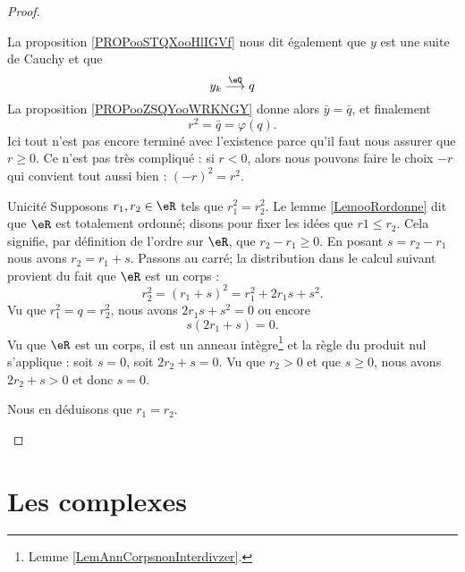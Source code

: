 \begin{proof}
\begin{subproof}
            La proposition \ref{PROPooSTQXooHlIGVf} nous dit également que \( y\) est une suite de Cauchy et que
            \begin{equation}
                y_k\stackrel{\eQ}{\longrightarrow}q
            \end{equation}
            La proposition \ref{PROPooZSQYooWRKNGY} donne alors \( \bar y=\bar q\), et finalement
            \begin{equation}
                r^2=\bar q=\varphi(q).
            \end{equation}
            Ici tout n'est pas encore terminé avec l'existence parce qu'il faut nous assurer que \( r\geq 0\). Ce n'est pas très compliqué : si \( r<0\), alors nous pouvons faire le choix \( -r\) qui convient tout aussi bien : \( (-r)^2=r^2\).
        \item[Unicité]
            Supposons \( r_1,r_2\in \eR\) tels que \( r_1^2=r_2^2\). Le lemme \ref{LemooRordonne} dit que \( \eR\) est totalement ordonné; disons pour fixer les idées que \( r1\leq r_2\). Cela signifie, par définition de l'ordre sur \( \eR\), que \( r_2-r_1\geq 0\). En posant \( s=r_2-r_1\) nous avons \( r_2=r_1+s\). Passons au carré; la distribution dans le calcul suivant provient du fait que \( \eR\) est un corps :
            \begin{equation}
                r_2^2=(r_1+s)^2=r_1^2+2r_1s+s^2.
            \end{equation}
            Vu que \( r_1^2=q=r_2^2\), nous avons \( 2r_1s+s^2=0\) ou encore
            \begin{equation}
                s(2r_1+s)=0.
            \end{equation}
            Vu que \( \eR\) est un corps, il est un anneau intègre\footnote{Lemme \ref{LemAnnCorpsnonInterdivzer}.} et la règle du produit nul s'applique : soit \( s=0\), soit \( 2r_2+s=0\). Vu que \( r_2>0\) et que \( s\geq 0\), nous avons \( 2r_2+s>0\) et donc \( s=0\). 

            Nous en déduisons que \( r_1=r_2\).
    \end{subproof}
\end{proof}

\section{Les complexes}

